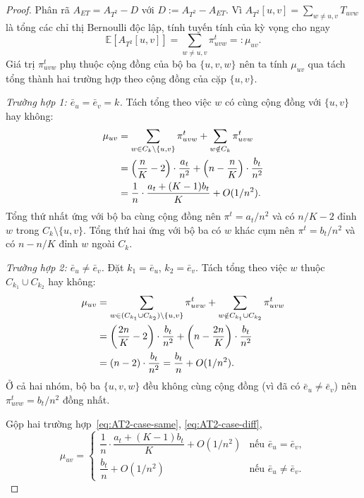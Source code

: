 \begin{proof}
Phân rã $A_{ET} = A_{T^2} - D$ với $D := A_{T^2} - A_{ET}$. Vì $A_{T^2}[u, v] = \sum_{w \neq u, v} T_{uvw}$ là tổng các chỉ thị Bernoulli độc lập, tính tuyến tính của kỳ vọng cho ngay
\[
    \mathbb{E}[A_{T^2}[u, v]] = \sum_{w \neq u, v} \pi^t_{uvw} =: \mu_{uv}.
\]
Giá trị $\pi^t_{uvw}$ phụ thuộc cộng đồng của bộ ba $\{u, v, w\}$ nên ta tính $\mu_{uv}$ qua tách tổng thành hai trường hợp theo cộng đồng của cặp $\{u, v\}$.

\emph{Trường hợp 1: $\bar e_u = \bar e_v = k$.} Tách tổng theo việc $w$ có cùng cộng đồng với $\{u, v\}$ hay không:
\begin{align}
    \mu_{uv}
        &= \sum_{w \in C_k \setminus \{u, v\}} \pi^t_{uvw} + \sum_{w \notin C_k} \pi^t_{uvw} \notag \\
        &= \left(\frac{n}{K} - 2\right) \cdot \frac{a_t}{n^2} + \left(n - \frac{n}{K}\right) \cdot \frac{b_t}{n^2} \notag \\
        &= \frac{1}{n} \cdot \frac{a_t + (K-1) b_t}{K} + O(1/n^2). \label{eq:AT2-case-same}
\end{align}
Tổng thứ nhất ứng với bộ ba cùng cộng đồng nên $\pi^t = a_t/n^2$ và có $n/K - 2$ đỉnh $w$ trong $C_k \setminus \{u, v\}$. Tổng thứ hai ứng với bộ ba có $w$ khác cụm nên $\pi^t = b_t/n^2$ và có $n - n/K$ đỉnh $w$ ngoài $C_k$.

\emph{Trường hợp 2: $\bar e_u \neq \bar e_v$.} Đặt $k_1 = \bar e_u$, $k_2 = \bar e_v$. Tách tổng theo việc $w$ thuộc $C_{k_1} \cup C_{k_2}$ hay không:
\begin{align}
    \mu_{uv}
        &= \sum_{w \in (C_{k_1} \cup C_{k_2}) \setminus \{u, v\}} \pi^t_{uvw} + \sum_{w \notin C_{k_1} \cup C_{k_2}} \pi^t_{uvw} \notag \\
        &= \left(\frac{2 n}{K} - 2\right) \cdot \frac{b_t}{n^2} + \left(n - \frac{2 n}{K}\right) \cdot \frac{b_t}{n^2} \notag \\
        &= (n - 2) \cdot \frac{b_t}{n^2}
        = \frac{b_t}{n} + O(1/n^2). \label{eq:AT2-case-diff}
\end{align}
Ở cả hai nhóm, bộ ba $\{u, v, w\}$ đều không cùng cộng đồng (vì đã có $\bar e_u \neq \bar e_v$) nên $\pi^t_{uvw} = b_t/n^2$ đồng nhất.

Gộp hai trường hợp~\eqref{eq:AT2-case-same}, \eqref{eq:AT2-case-diff},
\[
    \mu_{uv} = \begin{cases}
        \dfrac{1}{n} \cdot \dfrac{a_t + (K-1) b_t}{K} + O(1/n^2) & \text{nếu } \bar e_u = \bar e_v, \\[8pt]
        \dfrac{b_t}{n} + O(1/n^2) & \text{nếu } \bar e_u \neq \bar e_v.
    \end{cases}
\]


\end{proof}
